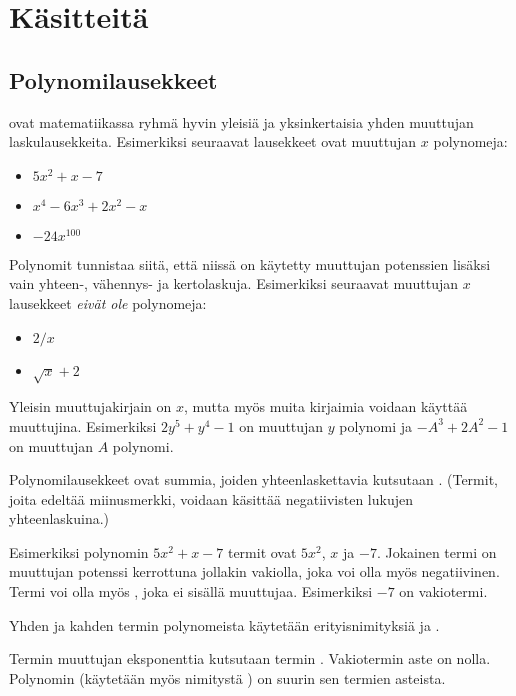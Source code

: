 \chapter{Käsitteitä}

\section*{Polynomilausekkeet}

 ovat matematiikassa ryhmä hyvin yleisiä ja yksinkertaisia yhden muuttujan laskulausekkeita.
Esimerkiksi seuraavat lausekkeet ovat muuttujan $x$ polynomeja:
\begin{itemize}
\item $5x^2+x-7$
\item $x^4-6x^3+2x^2-x$
\item $-24x^{100}$
\end{itemize}
Polynomit tunnistaa siitä, että niissä on käytetty muuttujan potenssien lisäksi vain yhteen-, vähennys- ja kertolaskuja. Esimerkiksi seuraavat muuttujan $x$ lausekkeet \emph{eivät ole} polynomeja:
\begin{itemize}
\item $2/x$
\item $\sqrt{x}+2$
\end{itemize}
Yleisin muuttujakirjain on $x$, mutta myös muita kirjaimia voidaan käyttää
muuttujina. Esimerkiksi $2y^5+y^4-1$ on muuttujan $y$ polynomi ja
$-A^3+2A^2-1$ on muuttujan $A$ polynomi.

Polynomilausekkeet ovat summia, joiden yhteenlaskettavia kutsutaan . (Termit, joita edeltää miinusmerkki, voidaan käsittää negatiivisten lukujen yhteenlaskuina.)

Esimerkiksi polynomin $5x^2+x-7$ termit ovat $5x^2$, $x$ ja $-7$. Jokainen termi on muuttujan potenssi kerrottuna jollakin vakiolla, joka voi olla myös  negatiivinen. Termi voi olla myös , joka ei sisällä muuttujaa. Esimerkiksi $-7$ on vakiotermi.

Yhden ja kahden termin polynomeista käytetään erityisnimityksiä  ja .

Termin muuttujan eksponenttia kutsutaan termin .
Vakiotermin aste on nolla.
Polynomin  (käytetään myös nimitystä ) on suurin sen termien asteista.

